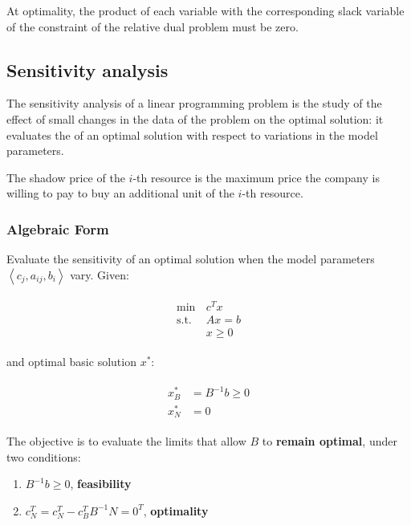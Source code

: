 \documentclass[english]{article}
\begin{document}
At optimality, the product of each variable with the corresponding slack variable of the constraint of the relative dual problem must be zero.

\subsection{Sensitivity analysis}

The sensitivity analysis of a linear programming problem is the study of the effect of small changes in the data of the problem on the optimal solution:
it evaluates the  of an optimal solution with respect to variations in the model parameters.

\begin{definition}
  The shadow price of the \(i\)-th resource is the maximum price the company is willing to pay to buy an additional unit of the \(i\)-th resource.
\end{definition}

\subsubsection{Algebraic Form}

Evaluate the sensitivity of an optimal solution when the model parameters \(\left\langle c_j, a_{ij}, b_i \right\rangle\) vary.
Given:

\begin{gather*}
  \begin{aligned}
    \min \,        & c^T x    \\
    \text{s.t.} \, & Ax = b   \\
                   & x \geq 0
  \end{aligned}
\end{gather*}

and optimal basic solution \(x^\ast\):

\begin{gather*}
  \begin{aligned}
    x_B^\ast & = B^{-1} b \geq 0 \\
    x_N^\ast & = 0
  \end{aligned}
\end{gather*}

The objective is to evaluate the limits that allow \(B\) to \textbf{remain optimal}, under two conditions:

\begin{enumerate}[itemsep=0.5ex]
  \item \(B^{-1} b \geq 0\), \textbf{feasibility}
  \item \(c_N^T = c_N^T - c_B^T B^{-1} N = 0^T\), \textbf{optimality}
\end{enumerate}
\end{document}

